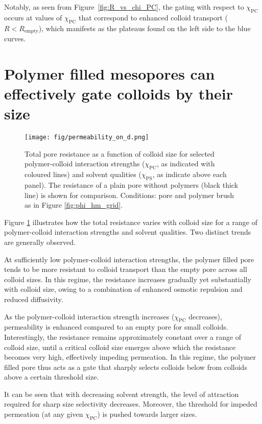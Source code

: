 \documentclass[12pt, a4paper]{article}
\begin{document}
Notably, as seen from Figure~\ref{fig:R_vs_chi_PC}, the gating with respect to $\chi_{\textrm{PC}}$ occurs at values of $\chi_{\textrm{PC}}$ that correspond to enhanced colloid transport ($R < R_{\textrm{empty}}$), which manifests as the plateaus found on the left side to the blue curves.

\section{Polymer filled mesopores can effectively gate colloids by their size}

\begin{figure}
    \centering
    \texttt{[image: fig/permeability\_on\_d.png]}
    \caption{
    Total pore resistance as a function of colloid size for selected polymer-colloid interaction strengths ($\chi_{\text{PC}}$, as indicated with coloured lines) 
    and solvent qualities ($\chi_{\text{PS}}$, as indicate above each panel). 
    The resistance of a plain pore without polymers (black thick line) is shown for comparison. 
    Conditions: pore and polymer brush as in Figure \ref{fig:phi_hm_grid}. 
    }
    \label{fig:R_vs_d}
\end{figure}

Figure \ref{fig:R_vs_d} illustrates how the total resistance varies with colloid size for a range of polymer-colloid interaction strengths and solvent qualities. 
Two distinct trends are generally observed.

At sufficiently low polymer-colloid interaction strengths, the polymer filled pore tends to be more resistant to colloid transport than the empty pore across  all colloid sizes. 
In this regime, the resistance increases gradually yet substantially with colloid size, owing to a combination of enhanced osmotic repulsion and reduced diffusivity.

As the polymer-colloid interaction strength increases ($\chi_{\text{PC}}$ decreases), permeability is enhanced compared to an empty pore for small colloids. 
Interestingly, the resistance remains approximately constant over a range of colloid size, until a critical colloid size emerges above which the resistance becomes very high, 
effectively impeding permeation. 
In this regime, the polymer filled pore thus acts as a gate that sharply selects colloids below from colloids above a certain threshold size.

It can be seen that with decreasing solvent strength, the level of attraction required for sharp size selectivity decreases. 
Moreover, the threshold for impeded permeation (at any given $\chi_{\text{PC}}$) is pushed towards larger sizes.
\end{document}
